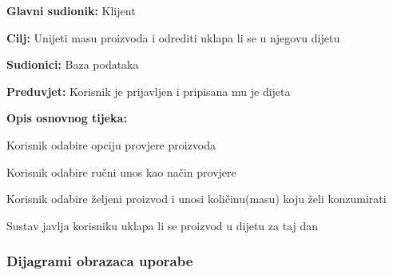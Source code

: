 					\noindent {}
					\begin{packed_item}
						
						\item \textbf{Glavni sudionik:} Klijent
						\item  \textbf{Cilj:} Unijeti masu proizvoda i odrediti uklapa li se u njegovu dijetu
						\item  \textbf{Sudionici:} Baza podataka
						\item  \textbf{Preduvjet:} Korisnik je prijavljen i pripisana mu je dijeta
						\item  \textbf{Opis osnovnog tijeka:}
						
						\item[] \begin{packed_enum}
							
							\item Korisnik odabire opciju provjere proizvoda
							\item Korisnik odabire ručni unos kao način provjere
							\item Korisnik odabire željeni proizvod i unosi količinu(masu) koju želi konzumirati
							\item Sustav javlja korisniku uklapa li se proizvod u dijetu za taj dan
							
						\end{packed_enum}
						
						
					\end{packed_item}
				
					
					
				\subsubsection{Dijagrami obrazaca uporabe}
					
